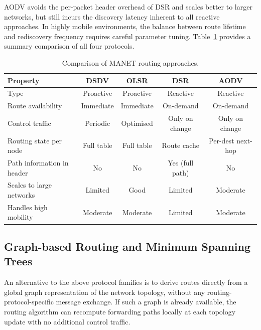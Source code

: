 AODV avoids the per-packet header overhead of DSR and scales better to larger networks, but
still incurs the discovery latency inherent to all reactive approaches. In highly mobile
environments, the balance between route lifetime and rediscovery frequency requires careful
parameter tuning. Table~\ref{tab:protocols} provides a summary comparison of all four
protocols.


\begin{table}[h]
\centering
\caption{Comparison of MANET routing approaches.}
\label{tab:protocols}
\begin{tabular}{lcccc}
\toprule
\textbf{Property}            & \textbf{DSDV} & \textbf{OLSR} & \textbf{DSR}  & \textbf{AODV} \\
\midrule
Type                         & Proactive  & Proactive  & Reactive   & Reactive   \\
Route availability           & Immediate  & Immediate  & On-demand  & On-demand  \\
Control traffic              & Periodic   & Optimised  & Only on change & Only on change \\
Routing state per node       & Full table & Full table & Route cache & Per-dest next-hop \\
Path information in header   & No         & No         & Yes (full path) & No        \\
Scales to large networks     & Limited    & Good       & Limited    & Moderate   \\
Handles high mobility        & Moderate   & Moderate   & Limited    & Moderate   \\
\bottomrule
\end{tabular}
\end{table}

\subsection{Graph-based Routing and Minimum Spanning Trees}
\label{sec:mst-routing}

An alternative to the above protocol families is to derive routes directly from a global graph
representation of the network topology, without any routing-protocol-specific message exchange.
If such a graph is already available, the routing algorithm can recompute forwarding paths
locally at each topology update with no additional control traffic.

